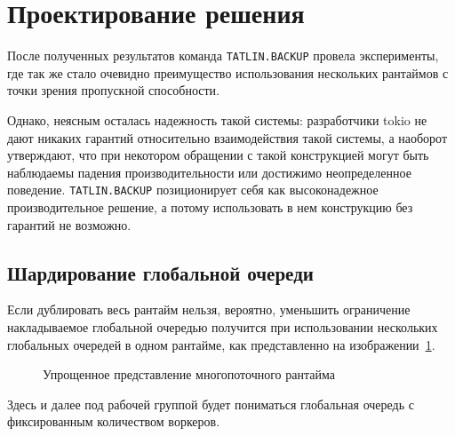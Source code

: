
\section{Проектирование решения}

После полученных результатов команда \verb|TATLIN.BACKUP| провела эксперименты, где так же стало очевидно преимущество использования нескольких рантаймов с точки зрения пропускной способности.

Однако, неясным осталась надежность такой системы: разработчики tokio не дают никаких гарантий относительно взаимодействия такой системы, а наоборот утверждают, что при некотором обращении с такой конструкцией могут быть наблюдаемы падения производительности или достижимо неопределенное поведение. \verb|TATLIN.BACKUP| позиционирует себя как высоконадежное производительное решение, а потому использовать в нем конструкцию без гарантий не возможно.

\subsection{Шардирование глобальной очереди}

Если дублировать весь рантайм нельзя, вероятно, уменьшить ограничение накладываемое глобальной очередью получится при использовании нескольких глобальных очередей в одном рантайме, как представленно на изображении~\ref{fig:tokio:duplicated_arch}.

\begin{figure}[H]
    \begin{center}
    \end{center}

    \caption{Упрощенное представление многопоточного рантайма}
    \label{fig:tokio:duplicated_arch}
\end{figure}
Здесь и далее под рабочей группой будет пониматься глобальная очередь с фиксированным количеством воркеров.

